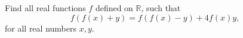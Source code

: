 Find all real functions $f$ defined on $ \mathbb R$,  such that  \[f(f(x)+y) = f(f(x)-y)+4f(x)y ,\]for all real numbers $x,y$.